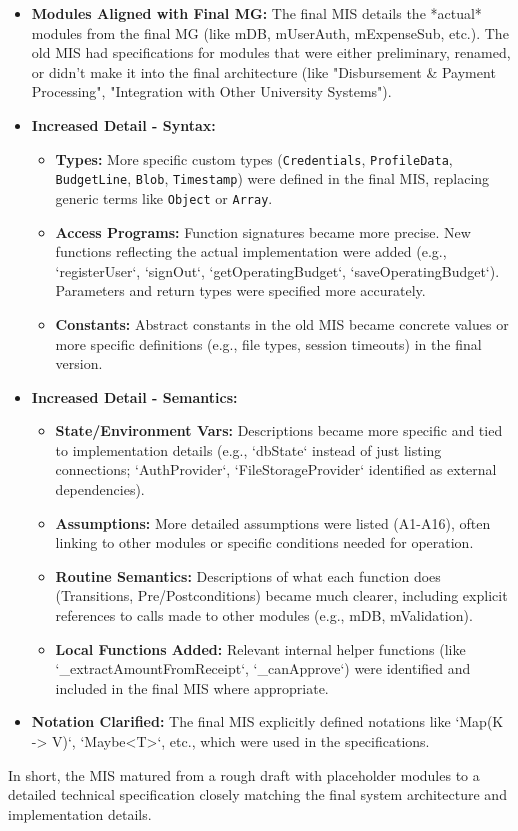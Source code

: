 \documentclass{article}
\begin{document}
\begin{itemize}
    \item \textbf{Modules Aligned with Final MG:} The final MIS details the *actual* modules from the final MG (like {mDB}, {mUserAuth}, {mExpenseSub}, etc.). The old MIS had specifications for modules that were either preliminary, renamed, or didn't make it into the final architecture (like "Disbursement \& Payment Processing", "Integration with Other University Systems").
    \item \textbf{Increased Detail - Syntax:}
        \begin{itemize}
            \item \textbf{Types:} More specific custom types (\texttt{Credentials}, \texttt{ProfileData}, \texttt{BudgetLine}, \texttt{Blob}, \texttt{Timestamp}) were defined in the final MIS, replacing generic terms like \texttt{Object} or \texttt{Array}.
            \item \textbf{Access Programs:} Function signatures became more precise. New functions reflecting the actual implementation were added (e.g., `registerUser`, `signOut`, `getOperatingBudget`, `saveOperatingBudget`). Parameters and return types were specified more accurately.
            \item \textbf{Constants:} Abstract constants in the old MIS became concrete values or more specific definitions (e.g., file types, session timeouts) in the final version.
        \end{itemize}
    \item \textbf{Increased Detail - Semantics:}
        \begin{itemize}
            \item \textbf{State/Environment Vars:} Descriptions became more specific and tied to implementation details (e.g., `dbState` instead of just listing connections; `AuthProvider`, `FileStorageProvider` identified as external dependencies).
            \item \textbf{Assumptions:} More detailed assumptions were listed (A1-A16), often linking to other modules or specific conditions needed for operation.
            \item \textbf{Routine Semantics:} Descriptions of what each function does (Transitions, Pre/Postconditions) became much clearer, including explicit references to calls made to other modules (e.g., {mDB}, {mValidation}).
            \item \textbf{Local Functions Added:} Relevant internal helper functions (like `\_extractAmountFromReceipt`, `\_canApprove`) were identified and included in the final MIS where appropriate.
        \end{itemize}
    \item \textbf{Notation Clarified:} The final MIS explicitly defined notations like `Map(K -> V)`, `Maybe<T>`, etc., which were used in the specifications.
\end{itemize}
In short, the MIS matured from a rough draft with placeholder modules to a detailed technical specification closely matching the final system architecture and implementation details.
\end{document}
